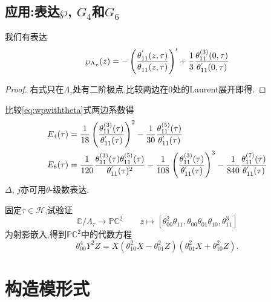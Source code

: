 \subsection{应用:表达$\wp$, $G_4$和$G_6$}

\begin{theorem}
	我们有表达
	\begin{equation}\label{eq:wpwiththeta}
	\wp_{\Lambda_{\tau}}(z) = - \left(\frac{\theta^{'}_{11}(z,\tau)}{\theta^{}_{11}(z,\tau)}\right)' +\frac{1}{3} \frac{\theta^{(3)}_{11}(0,\tau)}{\theta^{'}_{11}(0,\tau)}
	\end{equation}
\end{theorem}
\begin{proof}
	右式只在$\Lambda_{\tau}$处有二阶极点,比较两边在$0$处的Laurent展开即得.
\end{proof}
\begin{corollary}
	比较\eqref{eq:wpwiththeta}式两边系数得
	\begin{equation*}
	\begin{aligned}
	E_4(\tau)=\;&\frac{1}{18} \left(\frac{\theta^{(3)}_{11}(\tau)}{\theta^{'}_{11}(\tau)} \right)^2-\frac{1}{30} \frac{\theta^{(5)}_{11}(\tau)}{\theta^{'}_{11}(\tau)}\\
	E_6(\tau)=\;& \frac{1}{120} \frac{\theta^{(3)}_{11}(\tau)\theta^{(5)}_{11}(\tau)}{\theta^{'}_{11}(\tau)^2}-\frac{1}{108} \left(\frac{\theta^{(3)}_{11}(\tau)}{\theta^{'}_{11}(\tau)} \right)^3-\frac{1}{840} \frac{\theta^{(7)}_{11}(\tau)}{\theta^{'}_{11}(\tau)}
	\end{aligned}
	\end{equation*}
	$\Delta$, $j$亦可用$\theta$-级数表达.
\end{corollary}
\begin{exercise}
	固定$\tau \in \mathcal{H}$,试验证
	$$\mathbb{C}/\Lambda_{\tau} \longrightarrow \mathbb{PC}^2 \qquad z \longmapsto \left[\theta_{00}^2\theta_{11},\theta_{00}\theta_{01}\theta_{10},\theta_{11}^3 \right]$$
	为射影嵌入,得到$\mathbb{PC}^2$中的代数方程
	$$\theta_{00}^4 Y^2Z=X(\theta_{10}^2X-\theta_{01}^2Z)(\theta_{01}^2X+\theta_{10}^2Z).$$
\end{exercise}

%


\section{构造模形式}\label{sec:consofmodularform}


